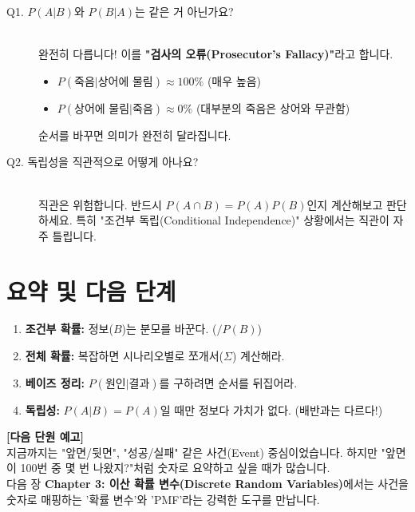 \documentclass[11pt,a4paper]{book}
\theoremstyle{definition}
\begin{document}
\begin{description}
    \item[Q1. $P(A|B)$와 $P(B|A)$는 같은 거 아닌가요?] \hfill \\
    완전히 다릅니다! 이를 \textbf{"검사의 오류(Prosecutor's Fallacy)"}라고 합니다.
    \begin{itemize}
        \item $P(\text{죽음}|\text{상어에 물림}) \approx 100\%$ (매우 높음)
        \item $P(\text{상어에 물림}|\text{죽음}) \approx 0\%$ (대부분의 죽음은 상어와 무관함)
    \end{itemize}
    순서를 바꾸면 의미가 완전히 달라집니다.
    
    \item[Q2. 독립성을 직관적으로 어떻게 아나요?] \hfill \\
    직관은 위험합니다. 반드시 $P(A \cap B) = P(A)P(B)$인지 계산해보고 판단하세요. 특히 "조건부 독립(Conditional Independence)" 상황에서는 직관이 자주 틀립니다.
\end{description}

\section{요약 및 다음 단계}

\begin{tcolorbox}[colback=mainblue!10, colframe=mainblue, title={\textbf{📝 Unit 1-2 핵심 요약}}]
\begin{enumerate}
    \item \textbf{조건부 확률:} 정보($B$)는 분모를 바꾼다. ($/P(B)$)
    \item \textbf{전체 확률:} 복잡하면 시나리오별로 쪼개서($\Sigma$) 계산해라.
    \item \textbf{베이즈 정리:} $P(\text{원인}|\text{결과})$를 구하려면 순서를 뒤집어라.
    \item \textbf{독립성:} $P(A|B) = P(A)$일 때만 정보다 가치가 없다. (배반과는 다르다!)
\end{enumerate}
\end{tcolorbox}

\vspace{0.5cm}
\textbf{[다음 단원 예고]} \\
지금까지는 "앞면/뒷면", "성공/실패" 같은 사건(Event) 중심이었습니다. 하지만 "앞면이 100번 중 몇 번 나왔지?"처럼 숫자로 요약하고 싶을 때가 많습니다. \\
다음 장 \textbf{Chapter 3: 이산 확률 변수(Discrete Random Variables)}에서는 사건을 숫자로 매핑하는 '확률 변수'와 'PMF'라는 강력한 도구를 만납니다.
\end{document}
